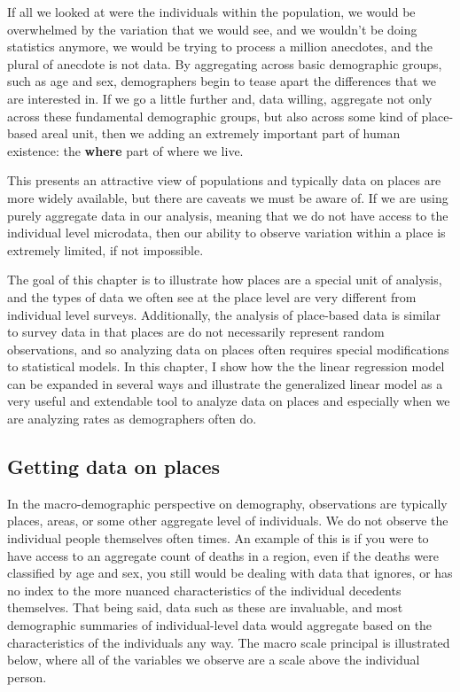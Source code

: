 \documentclass[
]{article}
\begin{document}
If all we looked at were the individuals within the population, we would be overwhelmed by the variation that we would see, and we wouldn't be doing statistics anymore, we would be trying to process a million anecdotes, and the plural of anecdote is not data. By aggregating across basic demographic groups, such as age and sex, demographers begin to tease apart the differences that we are interested in. If we go a little further and, data willing, aggregate not only across these fundamental demographic groups, but also across some kind of place-based areal unit, then we adding an extremely important part of human existence: the \textbf{where} part of where we live.

This presents an attractive view of populations and typically data on places are more widely available, but there are caveats we must be aware of. If we are using purely aggregate data in our analysis, meaning that we do not have access to the individual level microdata, then our ability to observe variation within a place is extremely limited, if not impossible.

The goal of this chapter is to illustrate how places are a special unit of analysis, and the types of data we often see at the place level are very different from individual level surveys. Additionally, the analysis of place-based data is similar to survey data in that places are do not necessarily represent random observations, and so analyzing data on places often requires special modifications to statistical models. In this chapter, I show how the the linear regression model can be expanded in several ways and illustrate the generalized linear model as a very useful and extendable tool to analyze data on places and especially when we are analyzing rates as demographers often do.

\hypertarget{getting-data-on-places}{%
\subsection{Getting data on places}\label{getting-data-on-places}}

In the macro-demographic perspective on demography, observations are typically places, areas, or some other aggregate level of individuals. We do not observe the individual people themselves often times. An example of this is if you were to have access to an aggregate count of deaths in a region, even if the deaths were classified by age and sex, you still would be dealing with data that ignores, or has no index to the more nuanced characteristics of the individual decedents themselves. That being said, data such as these are invaluable, and most demographic summaries of individual-level data would aggregate based on the characteristics of the individuals any way. The macro scale principal is illustrated below, where all of the variables we observe are a scale above the individual person.
\end{document}

